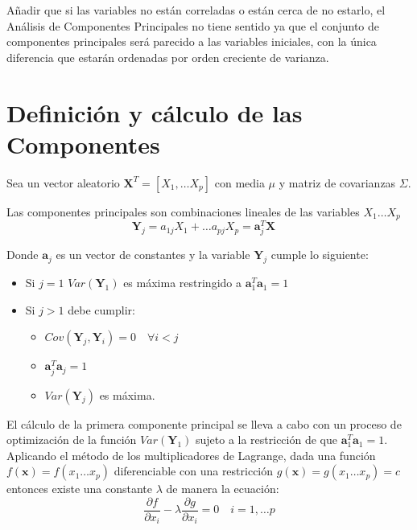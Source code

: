 Añadir que si las variables no están correladas o están cerca de no estarlo, el Análisis de Componentes Principales no tiene sentido ya que el conjunto de componentes principales será parecido a las variables iniciales, con la única diferencia que estarán ordenadas por orden creciente de varianza.  


\section{Definición y cálculo de las Componentes}

Sea un vector aleatorio $\textbf{X}^T=[X_1,\ldots X_p]$ con media $\mu$ y matriz de covarianzas $\Sigma$. 
\begin{defi}
Las componentes principales son combinaciones lineales de las variables $X_1 \ldots X_p$
\begin{equation}
\textbf{Y}_j=a_{1j}X_1+\ldots a_{pj}X_p=\textbf{a}_j^T\textbf{X}\quad 
\end{equation}

\noindent Donde $\textbf{a}_j$ es un vector de constantes y la variable $\textbf{Y}_j$ cumple lo siguiente:
\begin{itemize}
\item Si $j=1$ $Var(\textbf{Y}_1)$ es máxima restringido a $\textbf{a}_1^T \textbf{a}_1=1$
\item Si $j>1$ debe cumplir:
\begin{itemize}
\item $Cov(\textbf{Y}_j,\textbf{Y}_i)=0\quad \forall i<j $
\item $\textbf{a}_j^T \textbf{a}_j=1$
\item $Var(\textbf{Y}_j)$ es máxima. 
\end{itemize}

\end{itemize}

\end{defi}

\noindent El cálculo de la primera componente principal se lleva a cabo con un proceso de optimización de la función $Var(\textbf{Y}_1)$ sujeto a la restricción de que $\textbf{a}_1^T\textbf{a}_1=1$. Aplicando el método de los multiplicadores de Lagrange, dada una función $f(\textbf{x})=f(x_1\ldots x_p)$ diferenciable con una restricción $g(\textbf{x})=g(x_1\ldots x_p)=c$ entonces existe una constante $\lambda$ de manera la ecuación:
\begin{equation}
\dfrac{\partial f}{\partial x_i}-\lambda\dfrac{\partial g}{\partial x_i}=0 \quad i=1,\ldots p 
\end{equation}

